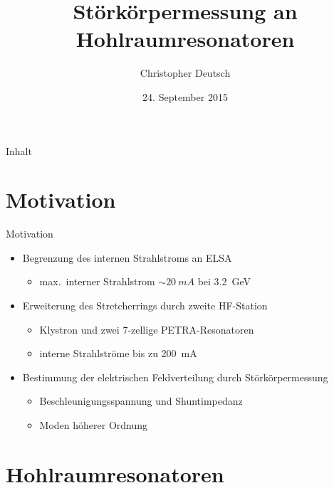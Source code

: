 \documentclass[12pt,xcolor=dvipsnames,professionalfonts]{beamer}
\author[Christopher Deutsch]
{Christopher Deutsch}
\title
{Störkörpermessung an Hohlraumresonatoren}
\subtitle
{}
\institute[]
{Physikalisches Institut der Universität Bonn\\
Seminar zur Bachelorarbeit}
\date{24. September 2015}
\begin{document}
\maketitle

\begin{frame}{Inhalt}
	\tableofcontents
\end{frame}

\section{Motivation}
\begin{frame}{Motivation}
	\begin{itemize}
		\item Begrenzung des internen Strahlstroms an ELSA
		\begin{itemize}
			\setlength\itemsep{0.25em}
			\item max.\ interner Strahlstrom  $\sim\SI{20}{mA}$ bei \SI{3.2}{GeV}
		\end{itemize}
		\vfill
		
		\item Erweiterung des Stretcherrings durch zweite HF-Station
		\begin{itemize}
			\setlength\itemsep{0.25em}
			\item Klystron und zwei 7-zellige PETRA-Resonatoren
			\item interne Strahlströme bis zu \SI{200}{mA}
		\end{itemize}
		\vfill
		
		\item Bestimmung der elektrischen Feldverteilung durch Störkörpermessung
		\begin{itemize}
			\setlength\itemsep{0.25em}
			\item Beschleunigungsspannung und Shuntimpedanz
			\item Moden höherer Ordnung
		\end{itemize}
	\end{itemize}
\end{frame}


\section{Hohlraumresonatoren}
\end{document}
